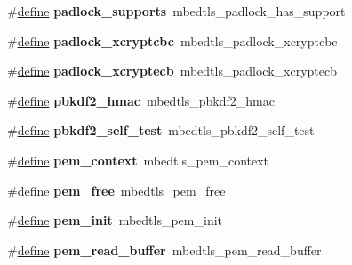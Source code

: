 \begin{DoxyCompactItemize}
\item 
\mbox{\label{compat-1_83_8h_ad0f96d6220bcf9718d8c07489d0f2495}} 
\#\hyperlink{structdefine}{define} {\bfseries padlock\+\_\+supports}~mbedtls\+\_\+padlock\+\_\+has\+\_\+support
\item 
\mbox{\label{compat-1_83_8h_a3788ea0f0500a0be43ac30664af3f1b4}} 
\#\hyperlink{structdefine}{define} {\bfseries padlock\+\_\+xcryptcbc}~mbedtls\+\_\+padlock\+\_\+xcryptcbc
\item 
\mbox{\label{compat-1_83_8h_ab0827df39db67247591a27094cfc64ea}} 
\#\hyperlink{structdefine}{define} {\bfseries padlock\+\_\+xcryptecb}~mbedtls\+\_\+padlock\+\_\+xcryptecb
\item 
\mbox{\label{compat-1_83_8h_aed93945b4ca8c6aece5652fbfe494f18}} 
\#\hyperlink{structdefine}{define} {\bfseries pbkdf2\+\_\+hmac}~mbedtls\+\_\+pbkdf2\+\_\+hmac
\item 
\mbox{\label{compat-1_83_8h_a345b31ed49c064524f6214d1c325b702}} 
\#\hyperlink{structdefine}{define} {\bfseries pbkdf2\+\_\+self\+\_\+test}~mbedtls\+\_\+pbkdf2\+\_\+self\+\_\+test
\item 
\mbox{\label{compat-1_83_8h_a4bc4cd04c1945439a87f3a42e8c98d79}} 
\#\hyperlink{structdefine}{define} {\bfseries pem\+\_\+context}~mbedtls\+\_\+pem\+\_\+context
\item 
\mbox{\label{compat-1_83_8h_a6bf177cadc5c403b038a554b0b964333}} 
\#\hyperlink{structdefine}{define} {\bfseries pem\+\_\+free}~mbedtls\+\_\+pem\+\_\+free
\item 
\mbox{\label{compat-1_83_8h_a1d466b90a49b13285db8d5bf5c70005d}} 
\#\hyperlink{structdefine}{define} {\bfseries pem\+\_\+init}~mbedtls\+\_\+pem\+\_\+init
\item 
\mbox{\label{compat-1_83_8h_a7840782f867eba1791635ee3b8b13325}} 
\#\hyperlink{structdefine}{define} {\bfseries pem\+\_\+read\+\_\+buffer}~mbedtls\+\_\+pem\+\_\+read\+\_\+buffer
\item 
\mbox{\label{compat-1_83_8h_a4e8691b72194067a6d7532cb99d9d9c6}} 

\end{DoxyCompactItemize}
